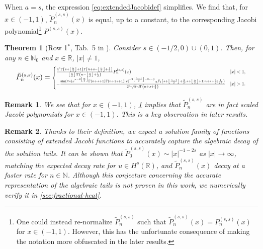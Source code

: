 \documentclass[10pt,a4paper]{article}
\newcommand{\eP}{\tilde{P}}
\newtheorem{theorem}{Theorem}[section]
\newtheorem{remark}{Remark}[section]
\numberwithin{equation}{section}
\begin{document}
When $a=s$, the expression \cref{eq:extendedJacobidef} simplifies. We find that, for $x \in (-1,1)$, $\eP^{(s,s)}_n(x)$ is equal, up to a constant, to the corresponding Jacobi polynomial\footnote{One could instead re-normalize $\eP^{(s,s)}_n$ such that $\eP^{(s,s)}_n(x) = P^{(s,s)}_n(x)$ for $x \in (-1,1)$. However, this has the unfortunate consequence of making the notation more obfuscated in the later results.} $P^{(s,s)}(x)$. 
\begin{theorem}[Row 1$^*$, Tab.~5 in \cite{Gutleb2023}]
\label{thm:fractionalwholespaceultra}
Consider $s \in (-1/2,0) \cup (0,1)$. Then, for any  $n \in \mathbb{N}_0$  and $x \in \mathbb{R}$, $|x| \neq 1$,
\begin{align}
\eP^{(s,s)}_{n}(x) = 
\resizebox{0.8\textwidth}{!}{$
\begin{cases}  \frac{4^s \Gamma \left(s+\left\lfloor \frac{n}{2}\right\rfloor +1\right) \Gamma \left(n+s-\left\lfloor \frac{n}{2}\right\rfloor +\frac{1}{2}\right)}{\left\lfloor \frac{n}{2}\right\rfloor ! \Gamma \left(n-\left\lfloor \frac{n}{2}\right\rfloor +\frac{1}{2}\right)} P_n^{(s,s)}(x) &|x|<1,  \\
-\frac{ \sin (\pi  s) x^{n-2 \left\lfloor \frac{n}{2}\right\rfloor } \Gamma (n+s+1) \Gamma (n+2 s+1) | x| ^{-2 \left\lfloor \frac{n-1}{2}\right\rfloor -2 s-3} \, _2F_1\left(s+\left\lfloor \frac{n-1}{2}\right\rfloor +\frac{3}{2},s+\left\lfloor \frac{n}{2}\right\rfloor +1;n+s+\frac{3}{2};\frac{1}{x^2}\right)}{2^n \sqrt{\pi } n! \Gamma \left(n+s+\frac{3}{2}\right)} & |x|>1.  \end{cases}$}
\end{align}
\end{theorem}
\begin{remark}
We see that for $x \in (-1,1)$, \cref{thm:fractionalwholespaceultra} implies that $\eP_n^{(s,s)}$ are in fact scaled Jacobi polynomials for $x \in (-1,1)$. This is a key observation in later results.
\end{remark}

\begin{remark}
Thanks to their definition, we expect a solution family of functions consisting of extended Jacobi functions to accurately capture the algebraic decay of the solution tails. It can be shown that $\eP_0^{(s,s)}(x) \sim |x|^{-1-2s}$ as $|x| \to \infty$, matching the expected decay rate for $u \in H^s(\mathbb{R})$, and $\eP_n^{(s,s)}(x)$ decay at a faster rate for  $n \in \mathbb{N}$. Although this conjecture concerning the accurate representation of the algebraic tails is not proven in this work, we numerically verify it in \cref{sec:fractional-heat}. 
\end{remark}
\end{document}

